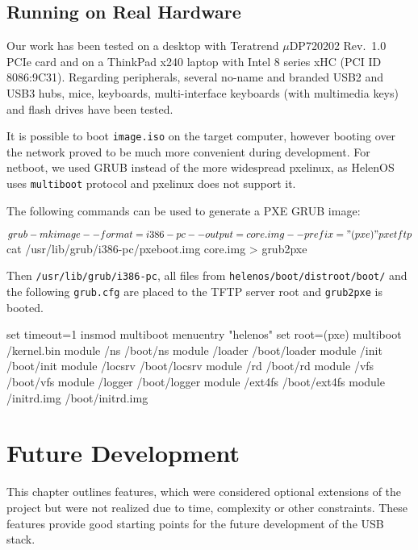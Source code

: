 
\subsection{Running on Real Hardware}

Our work has been tested on a desktop with Teratrend $\mu$DP720202 Rev.\ 1.0
PCIe card and on a ThinkPad x240 laptop with Intel 8 series xHC (PCI ID
8086:9C31).  Regarding peripherals, several no-name and branded USB2 and USB3
hubs, mice, keyboards, multi-interface keyboards (with multimedia keys) and
flash drives have been tested.

It is possible to boot \texttt{image.iso} on the target computer, however
booting over the network proved to be much more convenient during development.
For netboot, we used GRUB instead of the more widespread pxelinux, as HelenOS
uses \texttt{multiboot} protocol and pxelinux does not support it.

The following commands can be used to generate a PXE GRUB image:

\begin{bdsh}
$ grub-mkimage --format=i386-pc --output=core.img --prefix="(pxe)" pxe tftp
$ cat /usr/lib/grub/i386-pc/pxeboot.img core.img > grub2pxe
\end{bdsh}

Then \texttt{/usr/lib/grub/i386-pc}, all files from
\texttt{helenos/boot/distroot/boot/} and the following \texttt{grub.cfg} are
placed to the TFTP server root and \texttt{grub2pxe} is booted.

\begin{bdsh}
set timeout=1
insmod multiboot
menuentry "helenos" {
  set root=(pxe)
  multiboot /kernel.bin
  module    /ns /boot/ns
  module    /loader /boot/loader
  module    /init /boot/init
  module    /locsrv /boot/locsrv
  module    /rd /boot/rd
  module    /vfs /boot/vfs
  module    /logger /boot/logger
  module    /ext4fs /boot/ext4fs
  module    /initrd.img /boot/initrd.img
}
\end{bdsh}

\section{Future Development}

This chapter outlines features, which were considered optional extensions of
the project but were not realized due to time, complexity or other constraints.
These features provide good starting points for the future development of the
USB stack.

